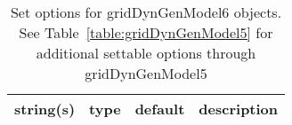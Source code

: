 \begin{table}[ht]
\centering
\begin{tabular}{p{5cm} c c p{7cm}}
\hline
string(s) & type & default & description \\
\hline
\hline
\end{tabular}
\caption{Set options for gridDynGenModel6 objects. See Table~\ref{table:gridDynGenModel5} for additional settable options through gridDynGenModel5}
\label{table:gridDynGenModel6}
\end{table}
